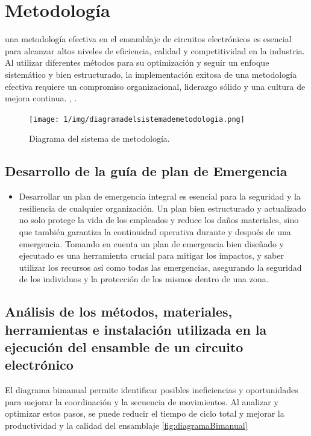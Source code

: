     \section{ Metodología }
    una metodología efectiva en el ensamblaje de circuitos electrónicos es esencial para alcanzar altos niveles de eficiencia, calidad y competitividad en la industria. Al utilizar diferentes métodos para su optimización y seguir un enfoque sistemático y bien estructurado, la implementación exitosa de una metodología efectiva requiere un compromiso organizacional, liderazgo sólido y una cultura de mejora continua.
    \cite{Groover}, \cite{Niebel}.
    \begin{figure}[H]
        \centering
    \texttt{[image: 1/img/diagramadelsistemademetodologia.png]}
        \caption{Diagrama del sistema de metodología.}
    \end{figure}
    
    
    \subsection{Desarrollo de la guía de plan de Emergencia}
    \begin{itemize}
    \item Desarrollar un plan de emergencia integral es esencial para la seguridad y la resiliencia de cualquier organización. Un plan bien estructurado y actualizado no solo protege la vida de los empleados y reduce los daños materiales, sino que también garantiza la continuidad operativa durante y después de una emergencia.
    Tomando en cuenta un plan de emergencia bien diseñado y ejecutado es una herramienta crucial para mitigar los impactos, y saber utilizar los recursos así como todas las emergencias, asegurando la seguridad de los individuos y la protección de los mismos dentro de una zona.
    \end{itemize}
    \subsection{Análisis de los métodos, materiales, herramientas e instalación utilizada en la ejecución del ensamble de un circuito electrónico}
    
    El diagrama bimanual permite identificar posibles ineficiencias y oportunidades para mejorar la coordinación y la secuencia de movimientos. Al analizar y optimizar estos pasos, se puede reducir el tiempo de ciclo total y mejorar la productividad y la calidad del ensamblaje \ref{fig:diagramaBimanual}
     
